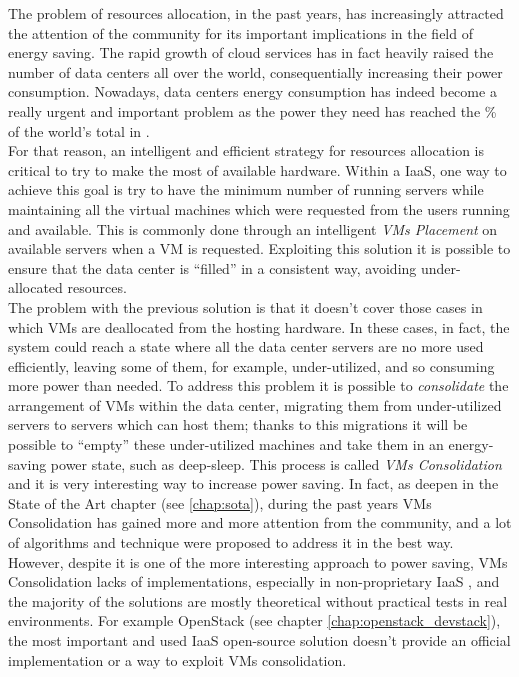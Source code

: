 
The problem of resources allocation, in the past years, has increasingly attracted the attention of the community for its important implications in the field of energy saving. The rapid growth of cloud services has in fact heavily raised the number of data centers all over the world, consequentially increasing their power consumption. Nowadays, data centers energy consumption has indeed become a really urgent and important problem as the power they need has reached the \% of the world's total in .\\
For that reason, an intelligent and efficient strategy for resources allocation is critical to try to make the most of available hardware. Within a IaaS, one way to achieve this goal is try to have the minimum number of running servers while maintaining all the virtual machines which were requested from the users running and available. This is commonly done through an intelligent \textit{VMs Placement} on available servers when a VM is requested. Exploiting this solution it is possible to ensure that the data center is ``filled'' in a consistent way, avoiding under-allocated resources.\\
The problem with the previous solution is that it doesn't cover those cases in which VMs are deallocated from the hosting hardware. In these cases, in fact, the system could reach a state where all the data center servers are no more used efficiently, leaving some of them, for example, under-utilized, and so consuming more power than needed. To address this problem it is possible to \textit{consolidate} the arrangement of VMs within the data center, migrating them from under-utilized servers to servers which can host them; thanks to this migrations it will be possible to ``empty'' these under-utilized machines and take them in an energy-saving power state, such as deep-sleep. This process is called \textit{VMs Consolidation} and it is  very interesting way to increase power saving. In fact, as deepen in the State of the Art chapter (see \ref{chap:sota}), during the past years VMs Consolidation has gained more and more attention from the community, and a lot of algorithms and technique were proposed to address it in the best way.\\
However, despite it is one of the more interesting approach to power saving, VMs Consolidation lacks of implementations, especially in non-proprietary IaaS , and the majority of the solutions are mostly theoretical without practical tests in real environments. For example OpenStack (see chapter \ref{chap:openstack_devstack}), the most important and used IaaS open-source solution doesn't provide an official implementation or a way to exploit VMs consolidation.

